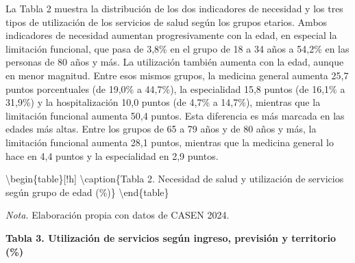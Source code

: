\documentclass[
  spanish,
  a4paper,
  oneside]{scrbook}
\begin{document}
La Tabla 2 muestra la distribución de los dos indicadores de necesidad y
los tres tipos de utilización de los servicios de salud según los grupos
etarios. Ambos indicadores de necesidad aumentan progresivamente con la
edad, en especial la limitación funcional, que pasa de 3,8\% en el grupo
de 18 a 34 años a 54,2\% en las personas de 80 años y más. La
utilización también aumenta con la edad, aunque en menor magnitud. Entre
esos mismos grupos, la medicina general aumenta 25,7 puntos porcentuales
(de 19,0\% a 44,7\%), la especialidad 15,8 puntos (de 16,1\% a 31,9\%) y
la hospitalización 10,0 puntos (de 4,7\% a 14,7\%), mientras que la
limitación funcional aumenta 50,4 puntos. Esta diferencia es más marcada
en las edades más altas. Entre los grupos de 65 a 79 años y de 80 años y
más, la limitación funcional aumenta 28,1 puntos, mientras que la
medicina general lo hace en 4,4 puntos y la especialidad en 2,9 puntos.

\textbackslash begin\{table\}{[}!h{]} \centering
\textbackslash caption\{\label{tab:unnamed-chunk-3}Tabla 2. Necesidad de
salud y utilización de servicios según grupo de edad (\%)\} \centering
{} \textbackslash end\{table\}

\emph{Nota.} Elaboración propia con datos de CASEN 2024.

\textbf{Tabla 3. Utilización de servicios según ingreso, previsión y
territorio (\%)}
\end{document}
